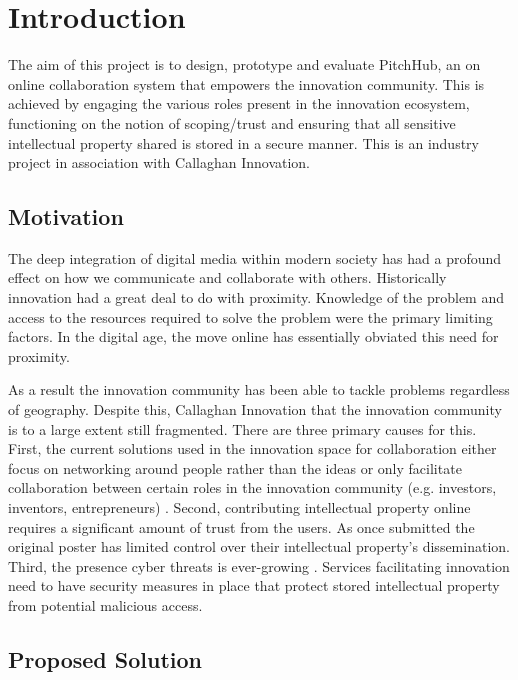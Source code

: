 \chapter{Introduction}
The aim of this project is to design, prototype and evaluate PitchHub, an on online collaboration system that empowers the innovation community. This is achieved by engaging the various roles present in the innovation ecosystem, functioning on the notion of scoping/trust and ensuring that all sensitive intellectual property shared is stored in a secure manner. This is an industry project in association with Callaghan Innovation.


\section{Motivation}
The deep integration of digital media within modern society has had a profound effect on how we communicate and collaborate with others. Historically innovation had a great deal to do with proximity. Knowledge of the problem and access to the resources required to solve the problem were the primary limiting factors. In the digital age, the move online has essentially obviated this need for proximity. 

As a result the innovation community has been able to tackle problems regardless of geography. Despite this, Callaghan Innovation that the innovation community is to a large extent still fragmented. There are three primary causes for this.
First, the current solutions used in the innovation space for collaboration either focus on networking around people rather than the ideas \cite{Linkedin:online}\cite{Googlegroups:online} or only facilitate collaboration between certain roles in the innovation community (e.g. investors, inventors, entrepreneurs) \cite{100open:online}\cite{Pledge:online}\cite{Angel:online}\cite{Quirky:online}. Second, contributing intellectual property online requires a significant amount of trust from the users. As once submitted the original poster has limited control over their intellectual property's dissemination. Third, the presence cyber threats is ever-growing \cite{Cybersecurity:online}. Services facilitating innovation need to have security measures in place that protect stored intellectual property from potential malicious access.

\section{Proposed Solution}\label{S:projectObjectives}

